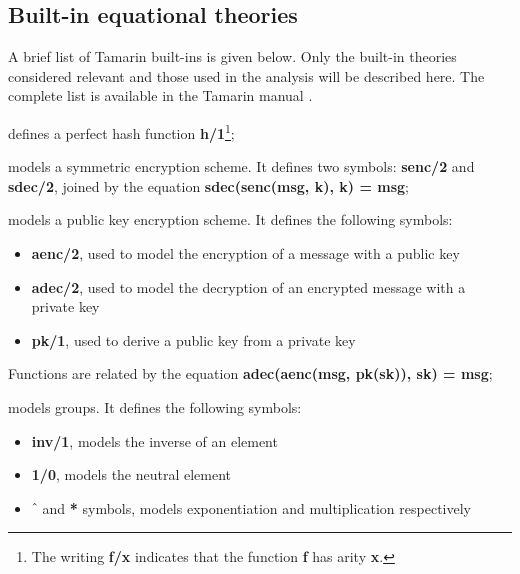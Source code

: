 \subsection{Built-in equational theories}
\label{sub:built-in-equational-theories}
A brief list of Tamarin built-ins is given below. Only the built-in theories considered relevant and those used in the analysis will be described here. The complete list is available in the Tamarin manual \cite{TamarinProverManual}.

\begin{description}[style=nextline]
  \item[hashing] defines a perfect hash function \textbf{h/1}\footnote{The writing \textbf{f/x} indicates that the function \textbf{f} has arity \textbf{x}.};
  \item[symmetric-encryption] models a symmetric encryption scheme. It defines two symbols: \textbf{senc/2} and \textbf{sdec/2}, joined by the equation \textbf{sdec(senc(msg, k), k) = msg};
  \item[asymmetric-encryption] models a public key encryption scheme. It defines the following symbols:

    \begin{itemize}
      \item{\textbf{aenc/2}, used to model the encryption of a message with a public key}
      \item{\textbf{adec/2}, used to model the decryption of an encrypted message with a private key}
      \item{\textbf{pk/1}, used to derive a public key from a private key}
    \end{itemize}

    Functions are related by the equation \textbf{adec(aenc(msg, pk(sk)), sk) = msg};

  \item[diffie-hellman] models \DiHe{} groups. It defines the following symbols:

    \begin{itemize}
      \item{\textbf{inv/1}, models the inverse of an element}
      \item{\textbf{1/0}, models the neutral element}
      \item{\textbf{$\hat{\mkern6mu}$} and \textbf{*} symbols, models exponentiation and multiplication respectively}
    \end{itemize}


\end{description}

